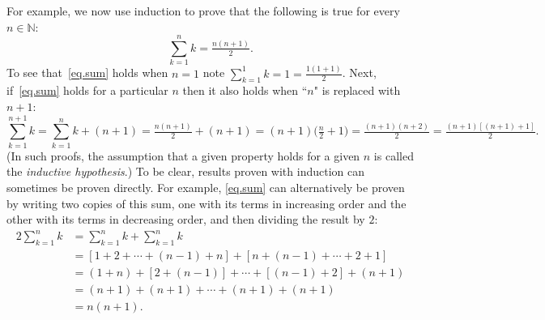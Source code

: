 \documentclass[12 pt,letterpaper]{article}
\newcommand{\bbN}{\mathbb{N}}
\newcommand{\bigparen}[1]{\bigl({#1}\bigr)}
\begin{document}
For example,
we now use induction to prove that the following is true for every $n\in\bbN$:
\begin{equation}
\label{eq.sum}
\sum_{k=1}^{n}k
=\tfrac{n(n+1)}{2}.
\end{equation}
To see that~\eqref{eq.sum} holds when $n=1$ note $\sum_{k=1}^{1}k=1=\tfrac{1(1+1)}{2}$.
Next, if~\eqref{eq.sum} holds for a particular $n$ then it also holds when ``$n$" is replaced with $n+1$:
\begin{equation*}
\sum_{k=1}^{n+1}k
=\sum_{k=1}^{n}k+(n+1)
=\tfrac{n(n+1)}{2}+(n+1)
=(n+1)\bigparen{\tfrac n2+1}
=\tfrac{(n+1)(n+2)}{2}
=\tfrac{(n+1)[(n+1)+1]}{2}.
\end{equation*}
(In such proofs, the assumption that a given property holds for a given $n$ is called the \textit{inductive hypothesis}.)
To be clear, results proven with induction can sometimes be proven directly.
For example, \eqref{eq.sum} can alternatively be proven by writing two copies of this sum, one with its terms in increasing order and the other with its terms in decreasing order,
and then dividing the result by $2$:
\begin{align*}
\label{eq.sum}
2\sum_{k=1}^{n}k
&=\sum_{k=1}^{n}k+\sum_{k=1}^{n}k\\
&=[1+2+\dotsb+(n-1)+n]+[n+(n-1)+\dotsb+2+1]\\
&=(1+n)+[2+(n-1)]+\dotsb+[(n-1)+2]+(n+1)\\
&=(n+1)+(n+1)+\dotsb+(n+1)+(n+1)\\
&=n(n+1).
\end{align*}
\end{document}
